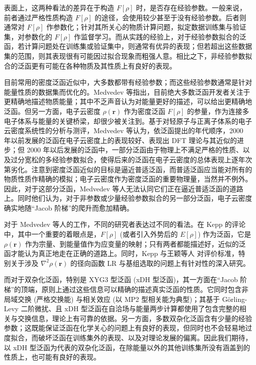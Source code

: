 表面上，这两种看法的差异在于构造 $F[\rho]$ 时，是否存在经验参数。一般来说，前者通过严格性质构造 $F[\rho]$ 的途径，会使用较少甚至于没有经验参数。后者则通常对 $F[\rho]$ 作参数化；针对其所关心的物质计算问题，拟定数据训练集与验证集，对参数化的 $F[\rho]$ 作监督学习。而从实践的经验上，对于经验参数拟合的泛函，若计算问题处在训练集或验证集中，则通常有优异的表现；但若超出这些数据集的范围，则其表现很有可能因过拟合现象而粗强人意。相比之下，非经验参数拟合的泛函更有可能在各种物质及其性质上有良好的表现。

目前常用的密度泛函近似中，大多数都带有经验参数；而这些经验参数通常是针对能量性质的数据集而优化的。Medvedev 等\cite{Medvedev-Lyssenko.S.2017}指出，目前绝大多数泛函开发者关注于更精确地描述物质能量；其中不乏声音认为对能量更好的描述，可以给出更精确地泛函。但另一方面，电子云密度 $\rho(\bm{r})$ 作为密度泛函 $F[\rho]$ 的参量，作为连接多电子体系与能量的关键桥梁，却很少被关注到。基于对轻原子与正离子体系的电子云密度系统性的分析与测评，Medvedev 等认为，依泛函提出的年代顺序，2000 年以前发展的泛函在电子云密度上的表现较好、表现出 DFT 理论与其近似的进步；但 2000 年以后发展的泛函中，一部分泛函由于物理上不满足严格的性质、以及过分宽松的多经验参数拟合，使得后来的泛函在电子云密度的总体表现上逐年次第劣化。注意到密度泛函近似的目标是逼近普适泛函，而普适泛函应当能对所有的物质性质作精确的模拟；电子云密度作为密度泛函的重要物理量，当然并不例外。因此，对于这部分泛函，Medvedev 等人无法认同它们正在逼近普适泛函的道路上。同时他们认为，对于非参数或少量经验参数拟合的另一部分泛函，电子云密度确实地随“Jacob 阶梯”\cite{Perdew-Schmidt.ACP.2001}的爬升而愈加精确。

对于 Medvedev 等人的工作，不同的研究者表达过不同的看法。在 Kepp 的评论\cite{Kepp-Kepp.S.2017}中，其中一个重要的着眼点是，$F[\rho]$ (或者引入外势后的 $E[\rho]$) 作为泛函，它是 $\rho(\bm{r})$ 作为宗量、到能量值作为应变量的映射；只有两者都能描述好，近似的泛函才能认为真正地走在正确的道路上。同时，Kepp\cite{Kepp-Kepp.S.2017} 与王颖等人\cite{Wang-He.JCTC.2017} 对评价标准，特别关于涉及 $\nabla^2 \rho(\bm{r})$ 的径向函数 LR 与基组选取的问题上有针对性的深入研究。

而对于双杂化泛函，特别是 XYG3 型泛函 (xDH 型泛函)\cite{Zhang-Goddard.PNAS.2009}，其一方面在“Jacob 阶梯”的顶端，原则上通过这些信息可以精确的描述真实泛函的性质。它同时包含非局域交换 (严格交换能) 与相关效应 (以 MP2 型相关能为典型)；其基于 G\"orling-Levy 二阶微扰\cite{Goerling-Levy.PRB.1993, Goerling-Levy.PRA.1994}、且 xDH 型泛函在自洽场与能量两步计算都使用了包含完整的相关与交换信息，理论上有可靠的依据。另一方面，多数双杂化泛函含有少量的经验参数；这既能保证泛函在化学关心的问题上有良好的表现，但同时也不会轻易地过度拟合，而破坏泛函在训练集外的表现、以及对理论发展的偏离。因此我们期待，以 xDH 型泛函为代表的双杂化泛函，在除能量以外的其他训练集所没有涵盖到的性质上，也可能有良好的表现。

